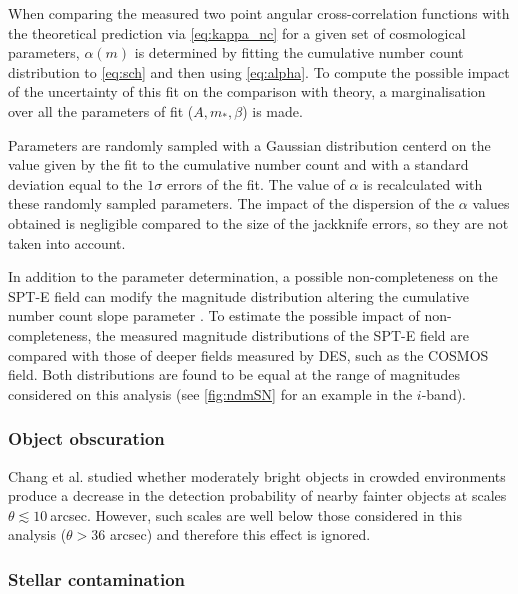 	When comparing the measured two point angular cross-correlation functions with the theoretical prediction via \autoref{eq:kappa_nc} for a given set of cosmological parameters, $\alpha(m)$ is determined by fitting the cumulative number count distribution to \autoref{eq:sch} and then using \autoref{eq:alpha}. To compute the possible impact of the uncertainty of this fit on the comparison with theory, a marginalisation over all the parameters of fit ($A,m_*,\beta$) is made.
\newline
	
Parameters are randomly sampled with a Gaussian distribution centerd on the value given by the fit to the cumulative number count and with a standard deviation equal to the $1\sigma$ errors of the fit. The value of $\alpha$ is recalculated with these randomly sampled parameters. The impact of the dispersion of the $\alpha$ values obtained is negligible compared to the size of the jackknife errors, so they are not taken into account.
\newline

In addition to the parameter determination, a possible non-completeness on the SPT-E field can modify the magnitude distribution altering the cumulative number count slope parameter \cite{2016MNRAS.455.3943H}. To estimate the possible impact of non-completeness, the measured magnitude distributions of the SPT-E field are compared with those of deeper fields measured by DES, such as the COSMOS field. Both distributions are found to be equal at the range of magnitudes considered on this analysis (see \autoref{fig:ndmSN} for an example in the $i$-band).

\subsubsection{Object obscuration}

Chang et al.\cite{0004-637X-801-2-73} studied whether moderately bright objects in crowded environments produce a decrease in the detection probability of nearby fainter objects at scales $\theta\lesssim10\ $arcsec. However, such scales are well below those considered in this analysis ($\theta>36$ arcsec) and therefore this effect is ignored.

\subsubsection{Stellar contamination}
    
